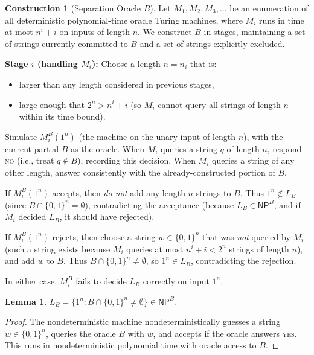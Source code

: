 \documentclass[11pt,a4paper]{article}
\theoremstyle{plain}
\newtheorem{lemma}[theorem]{Lemma}
\theoremstyle{definition}
\newtheorem{construction}[theorem]{Construction}
\theoremstyle{remark}
\newcommand{\NP}{\mathsf{NP}}
\newcommand{\bits}{\{0,1\}}
\begin{document}
\begin{construction}[Separation Oracle $B$]\label{cons:sep_oracle}
Let $M_1, M_2, M_3, \ldots$ be an enumeration of all deterministic polynomial-time
oracle Turing machines, where $M_i$ runs in time at most $n^i + i$ on inputs of
length $n$.  We construct $B$ in stages, maintaining a set of strings currently
committed to $B$ and a set of strings explicitly excluded.

\vspace{4pt}
\noindent\textbf{Stage $i$ (handling $M_i$):}
Choose a length $n = n_i$ that is:
\begin{itemize}
    \item larger than any length considered in previous stages,
    \item large enough that $2^n > n^i + i$ (so $M_i$ cannot query all strings
    of length $n$ within its time bound).
\end{itemize}

Simulate $M_i^B(1^{n})$ (the machine on the unary input of length $n$), with the
current partial $B$ as the oracle.  When $M_i$ queries a string $q$ of length
$n$, respond \textsc{no} (i.e., treat $q \notin B$), recording this decision.
When $M_i$ queries a string of any other length, answer consistently with the
already-constructed portion of $B$.

If $M_i^B(1^{n})$ accepts, then \emph{do not} add any length-$n$ strings to $B$.
Thus $1^n \notin L_B$ (since $B \cap \bits^n = \emptyset$), contradicting the
acceptance (because $L_B \in \NP^B$, and if $M_i$ decided $L_B$, it should have
rejected).

If $M_i^B(1^{n})$ rejects, then choose a string $w \in \bits^n$ that was
\emph{not} queried by $M_i$ (such a string exists because $M_i$ queries at most
$n^i + i < 2^n$ strings of length $n$), and add $w$ to $B$.  Thus
$B \cap \bits^n \neq \emptyset$, so $1^n \in L_B$, contradicting the rejection.

In either case, $M_i^B$ fails to decide $L_B$ correctly on input $1^n$.
\end{construction}

\begin{lemma}\label{lem:LB_in_NPB}
$L_B = \{1^n : B \cap \bits^n \neq \emptyset\} \in \NP^B$.
\end{lemma}
\begin{proof}
The nondeterministic machine nondeterministically guesses a string
$w \in \bits^n$, queries the oracle $B$ with $w$, and accepts if the oracle
answers \textsc{yes}.  This runs in nondeterministic polynomial time with oracle
access to $B$.
\end{proof}
\end{document}
